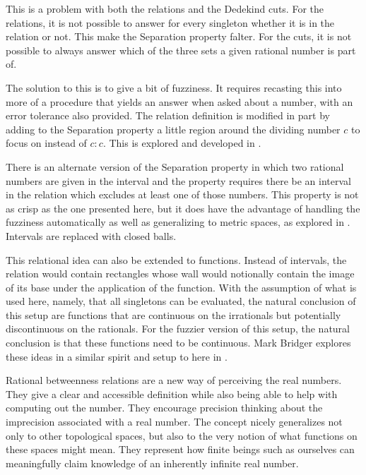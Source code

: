 \documentclass[12pt]{article}
\begin{document}
This is a problem with both the relations and the Dedekind cuts. For the relations, it is not possible to answer for every singleton whether it is in the relation or not. This make the Separation property falter. For the cuts, it is not possible to always answer which of the three sets a given rational number is part of. 

The solution to this is to give a bit of fuzziness. It requires recasting this into more of a procedure that yields an answer when asked about a number, with an error tolerance also provided. The relation definition is modified in part by adding to the Separation property a little region around the dividing number $c$ to focus on instead of $c:c$. This is explored and developed in \cite{taylor23main}.

There is an alternate version of the Separation property in which two rational numbers are given in the interval and the property requires there be an interval in the relation which excludes at least one of those numbers. This property is not as crisp as the one presented here, but it does have the advantage of handling the fuzziness automatically as well as generalizing to metric spaces, as explored in \cite{taylor23metric}. Intervals are replaced with closed balls. 

This relational idea can also be extended to functions. Instead of intervals, the relation would contain rectangles whose wall would notionally contain the image of its base under the application of the function. With the assumption of what is used here, namely, that all singletons can be evaluated, the natural conclusion of this setup are functions that are continuous on the irrationals but potentially discontinuous on the rationals. For the fuzzier version of this setup, the natural conclusion is that these functions need to be continuous. Mark Bridger explores  these ideas in a similar spirit and setup to here in \cite{bridger}.

Rational betweenness relations are a new way of perceiving the real numbers. They give a clear and accessible definition while also being able to help with computing out the number. They encourage precision thinking about the imprecision associated with a real number. The concept nicely generalizes not only to other topological spaces, but also to the very notion of what functions on these spaces might mean. They represent how finite beings such as ourselves can meaningfully claim knowledge of an inherently infinite real number. 


\medskip

\normalem %
\printbibliography
\end{document}
